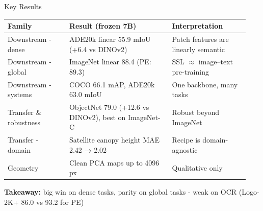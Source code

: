\documentclass[aspectratio=169,11pt]{beamer}
\begin{document}
\begin{frame}{Key Results}
    \begin{table}
        \centering
        \footnotesize
        \begin{tabular}{>{\raggedright\arraybackslash}p{0.24\linewidth} >{\raggedright\arraybackslash}p{0.40\linewidth} >{\raggedright\arraybackslash}p{0.30\linewidth}}
            \toprule[1.5pt]
            \textbf{Family} & \textbf{Result (frozen 7B)} & \textbf{Interpretation} \\
            \midrule[1.5pt]
            Downstream - dense & ADE20k linear 55.9 mIoU (+6.4 vs DINOv2) & Patch features are linearly semantic \\
            \midrule
            Downstream - global &  ImageNet linear 88.4 (PE: 89.3) &  SSL $\approx$ image--text pre-training \\
            \midrule
            Downstream - systems &  COCO 66.1 mAP, ADE20k 63.0 mIoU &  One backbone, many tasks \\
            \midrule
            Transfer \& robustness &  ObjectNet 79.0 (+12.6 vs DINOv2), best on ImageNet-C &  Robust beyond ImageNet \\
            \midrule
            Transfer - domain &  Satellite canopy height MAE 2.42 → 2.02 &  Recipe is domain-agnostic \\
            \midrule
            Geometry &  Clean PCA maps up to 4096 px &  Qualitative only \\
            \bottomrule[1.5pt]
        \end{tabular}
    \end{table}
    \vspace{5px}
    \textbf{Takeaway:} big win on dense tasks, parity on global tasks - weak on OCR (Logo-2K+ 86.0 vs 93.2 for PE)
\end{frame}
\end{document}

